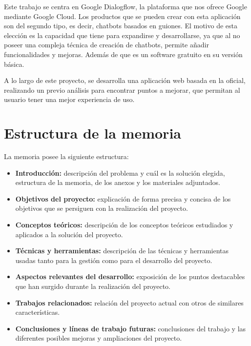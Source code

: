 Este trabajo se centra en Google Dialogflow, la plataforma que nos ofrece Google mediante Google Cloud. Los productos que se pueden crear con esta aplicación son del segundo tipo, es decir, chatbots basados en guiones. El motivo de esta elección es la capacidad que tiene para expandirse y desarrollarse, ya que al no poseer una compleja técnica de creación de chatbots, permite añadir funcionalidades y mejoras. Además de que es un software gratuito en su versión básica.

A lo largo de este proyecto, se desarrolla una aplicación web basada en la oficial, realizando un previo análisis para encontrar puntos a mejorar, que permitan al usuario tener una mejor experiencia de uso.


\section{Estructura de la memoria}\label{estructura-de-la-memoria}
La memoria posee la siguiente estructura:
	\begin{itemize}
		\tightlist		
		\item
			\textbf{Introducción: }
			descripción del problema y cuál es la solución elegida, estructura de la memoria, de los anexos y los materiales adjuntados.		
		\item
			\textbf{Objetivos del proyecto: }
			explicación de forma precisa y concisa de los objetivos que se persiguen con la realización del proyecto.		
		\item
			\textbf{Conceptos teóricos: }
			descripción de los conceptos teóricos estudiados y aplicados a la solución del proyecto.		
		\item
			\textbf{Técnicas y herramientas: }
			descripción de las técnicas y herramientas usadas tanto para la gestión como para el desarrollo del proyecto.		
		\item
			\textbf{Aspectos relevantes del desarrollo: }
			exposición de los puntos destacables que han surgido durante la realización del proyecto.			
		\item
			\textbf{Trabajos relacionados: }
			relación del proyecto actual con otros de similares características.			
		\item
			\textbf{Conclusiones y líneas de trabajo futuras: }
			conclusiones del trabajo y las diferentes posibles mejoras y ampliaciones del proyecto.
	\end{itemize}

